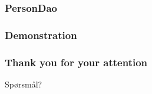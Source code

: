 \documentclass{beamer}
\begin{document}
	\begin{frame}
		\frametitle{PersonDao}
	\personDao
	\end{frame}

	
	\begin{frame}
		\frametitle{Demonstration}
	\end{frame}


	\begin{frame}
		\frametitle{Thank you for your attention}
		Spørsmål?
	\end{frame}
\end{document}

